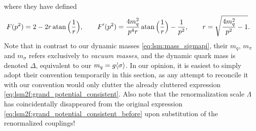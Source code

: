 where they have defined
\begin{equation}
	F(p^2) = 2 - 2 r \operatorname{atan} \Big(\frac1r\Big), \qquad
	F'(p^2) = \frac{4 m_q^2}{p^4 r} \operatorname{atan} \Big(\frac1r\Big) - \frac{1}{p^2}, \qquad
	r = \sqrt{\frac{4 m_q^2}{p^2}-1} .
\end{equation}
Note that in contrast to our dynamic masses \eqref{eq:lsm:mass_sigmapi},
their $m_q$, $m_\pi$ and $m_\sigma$ refers exclusively to \emph{vacuum masses},
and the dynamic quark mass is denoted $\Delta$, equivalent to our $m_q=g\langle \sigma \rangle$.
In our opinion, it is easiest to simply adopt their convention temporarily in this section,
as any attempt to reconcile it with our convention
would only clutter the already cluttered expression \eqref{eq:lsm2f:grand_potential_consistent}.
Also note that the renormalization scale $\Lambda$ has coincidentally disappeared from the original expression \eqref{eq:lsm2f:grand_potential_consistent_before} upon substitution of the renormalized couplings!

